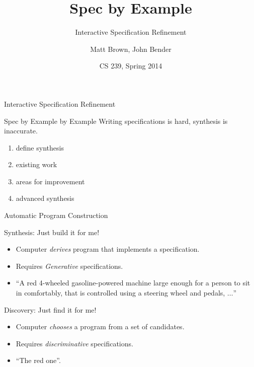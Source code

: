 \documentclass{beamer}
\title{Spec by Example}
\subtitle{Interactive Specification Refinement}
\author{Matt Brown, John Bender}
\date{CS 239, Spring 2014}
\begin{document}
\setlength{\abovedisplayskip}{0pt}
\setlength{\belowdisplayskip}{0pt}
\setlength{\abovedisplayshortskip}{0pt}
\setlength{\belowdisplayshortskip}{0pt}

\begin{frame}
  \titlepage
\end{frame}

\begin{frame}{Interactive Specification Refinement}
  \begin{block}{Spec by Example by Example}
    Writing specifications is hard, synthesis is inaccurate.

    \begin{enumerate}
      \item define synthesis
      \item existing work
      \item areas for improvement
      \item advanced synthesis
    \end{enumerate}
  \end{block}
\end{frame}

\begin{frame}{Automatic Program Construction}
  \begin{block}{Synthesis: Just build it for me!}
    \begin{itemize}
    \item{Computer {\em derives} program that implements a
        specification.}
    \item{Requires {\em Generative} specifications.}
    \item{``A red 4-wheeled gasoline-powered machine large enough for
        a person to sit in comfortably, that is controlled using a
        steering wheel and pedals, $\dots$''}
    \end{itemize}
  \end{block}

  \begin{block}{Discovery: Just find it for me!}
    \begin{itemize}
    \item{Computer {\em chooses} a program from a set of candidates.}
    \item{Requires {\em discriminative} specifications.}
    \item{``The red one''.}
    \end{itemize}
  \end{block}
\end{frame}
\end{document}
